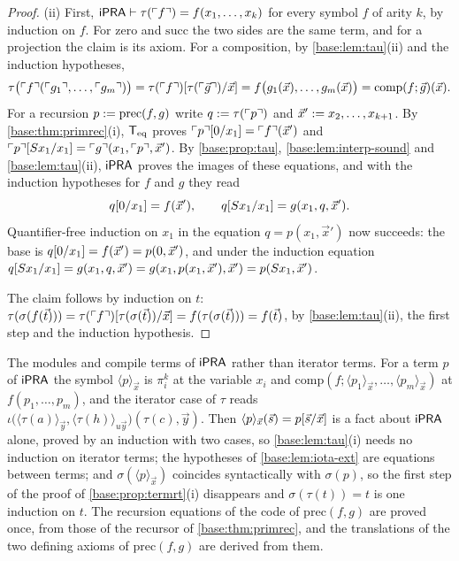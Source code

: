 \begin{proof}
(ii) First, $\mathsf{iPRA}\vdash\tau(\ulcorner f\urcorner)=f(x_1,\dots,x_k)$ for
every symbol $f$ of arity $k$, by induction on $f$.  For $\mathrm{zero}$ and
$\mathrm{succ}$ the two sides are the same term, and for a projection the
claim is its axiom.  For a composition, by \cref{base:lem:tau}(ii) and the
induction hypotheses,
\[
 \tau\bigl(\ulcorner f\urcorner(\ulcorner g_1\urcorner,\dots,
   \ulcorner g_m\urcorner)\bigr)
 =\tau(\ulcorner f\urcorner)[\tau(\ulcorner\vec g\urcorner)/\vec x]
 =f\bigl(g_1(\vec x),\dots,g_m(\vec x)\bigr)
 =\mathrm{comp}(f;\vec g)(\vec x).
\]
For a recursion $p\mathrel{:=}\mathrm{prec}(f,g)$ write
$q\mathrel{:=}\tau(\ulcorner p\urcorner)$ and $\vec x'\mathrel{:=} x_2,\dots,x_{k+1}$.
By \cref{base:thm:primrec}(i), $\mathsf{T}_{\mathrm{eq}}$ proves
$\ulcorner p\urcorner[0/x_1]=\ulcorner f\urcorner(\vec x')$ and
$\ulcorner p\urcorner[S x_1/x_1]
 =\ulcorner g\urcorner(x_1,\ulcorner p\urcorner,\vec x')$.  By
\cref{base:prop:tau}, \cref{base:lem:interp-sound} and
\cref{base:lem:tau}(ii), $\mathsf{iPRA}$ proves the images of these equations, and
with the induction hypotheses for $f$ and $g$ they read
\[
 q[0/x_1]=f(\vec x'),\qquad
 q[S x_1/x_1]=g(x_1,q,\vec x').
\]
Quantifier-free induction on $x_1$ in the equation
$q=p(x_1,\vec x')$ now succeeds: the base is
$q[0/x_1]=f(\vec x')=p(0,\vec x')$, and under the induction equation
$q[S x_1/x_1]=g(x_1,q,\vec x')=g(x_1,p(x_1,\vec x'),\vec x')
 =p(S x_1,\vec x')$.

The claim follows by induction on $t$:
$\tau(\sigma(f(\vec t)))=\tau(\ulcorner f\urcorner)
 [\tau(\sigma(\vec t))/\vec x]=f(\tau(\sigma(\vec t)))=f(\vec t)$,
by \cref{base:lem:tau}(ii), the first step and the induction hypothesis.
\end{proof}

\begin{remark}
\label{base:rem:tau-lean}
The modules  and  compile terms of
$\mathsf{iPRA}$ rather than iterator terms.  For a term $p$ of $\mathsf{iPRA}$ the symbol
$\langle p\rangle_{\vec x}$ is $\pi^k_i$ at the variable $x_i$ and
$\mathrm{comp}(f;\langle p_1\rangle_{\vec x},\dots,\langle p_m\rangle_{\vec x})$
at $f(p_1,\dots,p_m)$, and the iterator case of $\tau$ reads
$\iota\bigl(\langle\tau(a)\rangle_{\vec y},\langle\tau(h)\rangle_{u\vec y}\bigr)
(\tau(c),\vec y)$.  Then $\langle p\rangle_{\vec x}(\vec s)=p[\vec s/\vec x]$
is a fact about $\mathsf{iPRA}$ alone, proved by an induction with two cases, so
\cref{base:lem:tau}(i) needs no induction on iterator terms; the hypotheses of
\cref{base:lem:iota-ext} are equations between terms; and
$\sigma(\langle p\rangle_{\vec x})$ coincides syntactically with $\sigma(p)$, so
the first step of the proof of \cref{base:prop:termrt}(i) disappears and
$\sigma(\tau(t))=t$ is one induction on $t$.  The recursion equations of the
code of $\mathrm{prec}(f,g)$ are proved once, from those of the recursor of
\cref{base:thm:primrec}, and the translations of the two defining axioms of
$\mathrm{prec}(f,g)$ are derived from them.
\end{remark}

